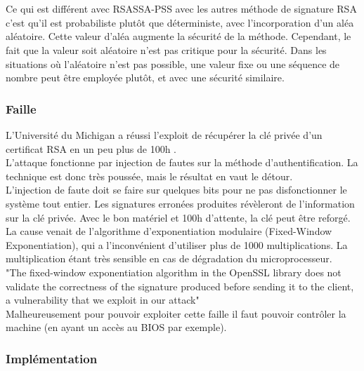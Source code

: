 \\ \\
Ce qui est différent avec RSASSA-PSS avec les autres méthode de signature RSA c'est qu'il est probabiliste plutôt que déterministe, avec l'incorporation d'un aléa aléatoire. Cette valeur d'aléa augmente la sécurité de la méthode. Cependant, le fait que la valeur soit aléatoire n'est pas critique pour la sécurité. Dans les situations où l'aléatoire n'est pas possible, une valeur fixe ou une séquence de nombre peut être employée plutôt, et avec une sécurité similaire.

		\subsubsection{Faille}
		
			L'Université du Michigan a réussi l'exploit de récupérer la 
			clé privée d'un certificat RSA en un peu plus de 100h
			\cite{andrea2010RSA} \cite{opensslvuln2010}.\\
			L'attaque fonctionne par injection de fautes \cite{fault2008lawson} 
			sur la méthode d'authentification. 
			La technique est donc très poussée, mais le résultat en vaut 
			le détour.\\
		
			L'injection de faute doit se faire sur quelques bits pour ne pas
			disfonctionner le système tout entier. 
			Les signatures erronées produites révèleront de l'information 
			sur la clé privée. 
			Avec le bon matériel et 100h d'attente, la clé peut être reforgé.\\
		
			La cause venait de l'algorithme d'exponentiation modulaire 
			(Fixed-Window Exponentiation), qui a l'inconvénient d'utiliser 
			plus de 1000 multiplications.
			La multiplication étant très sensible en cas de dégradation du
			microprocesseur.\\
			
			"The fixed-window exponentiation algorithm in the OpenSSL library 
			does not validate the correctness of the signature produced before
			sending it to the client, a vulnerability that we exploit in our
			attack"\\
			
			Malheureusement pour pouvoir exploiter cette faille il faut pouvoir
			contrôler la machine (en ayant un accès au BIOS par exemple).
	
		
		\subsubsection{Implémentation}
			
